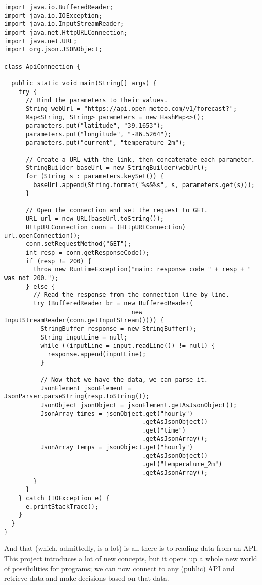 \begin{cl}[]{}
\begin{lstlisting}[language=MyJava]
import java.io.BufferedReader;
import java.io.IOException;
import java.io.InputStreamReader;
import java.net.HttpURLConnection;
import java.net.URL;
import org.json.JSONObject;

class ApiConnection {

  public static void main(String[] args) {
    try {
      // Bind the parameters to their values.
      String webUrl = "https://api.open-meteo.com/v1/forecast?";
      Map<String, String> parameters = new HashMap<>();
      parameters.put("latitude", "39.1653");
      parameters.put("longitude", "-86.5264");
      parameters.put("current", "temperature_2m");

      // Create a URL with the link, then concatenate each parameter.
      StringBuilder baseUrl = new StringBuilder(webUrl);
      for (String s : parameters.keySet()) { 
        baseUrl.append(String.format("%s&%s", s, parameters.get(s))); 
      }
    
      // Open the connection and set the request to GET.
      URL url = new URL(baseUrl.toString());
      HttpURLConnection conn = (HttpURLConnection) url.openConnection();
      conn.setRequestMethod("GET");
      int resp = conn.getResponseCode();
      if (resp != 200) {
        throw new RuntimeException("main: response code " + resp + " was not 200.");
      } else {
        // Read the response from the connection line-by-line.
        try (BufferedReader br = new BufferedReader(
                                   new InputStreamReader(conn.getInputStream()))) {
          StringBuffer response = new StringBuffer();
          String inputLine = null;
          while ((inputLine = input.readLine()) != null) {
            response.append(inputLine); 
          }

          // Now that we have the data, we can parse it.
          JsonElement jsonElement = JsonParser.parseString(resp.toString());
          JsonObject jsonObject = jsonElement.getAsJsonObject();
          JsonArray times = jsonObject.get("hourly")
                                      .getAsJsonObject()
                                      .get("time")
                                      .getAsJsonArray();
          JsonArray temps = jsonObject.get("hourly")
                                      .getAsJsonObject()
                                      .get("temperature_2m")
                                      .getAsJsonArray();
        }
      }
    } catch (IOException e) {
      e.printStackTrace();
    }
  }
}
\end{lstlisting}
\end{cl}

And that (which, admittedly, is a lot) is all there is to reading data from an API. This project introduces a lot of new concepts, but it opens up a whole new world of possibilities for programs; we can now connect to any (public) API and retrieve data and make decisions based on that data.